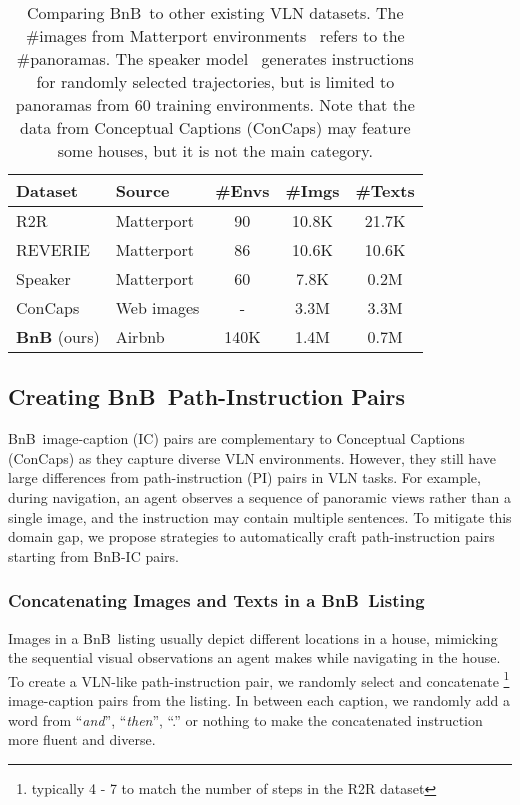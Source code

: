\RequirePackage[dvipsnames,table]{xcolor} \documentclass[10pt,twocolumn,letterpaper]{article}
\newcommand{\airbnb}{BnB}
\begin{document}
\begin{table}[t]
\centering
\tabcolsep=0.11cm
\small
\begin{tabular}{ll ccc}
\toprule
Dataset & Source & \#Envs & \#Imgs & \#Texts \\
\midrule
R2R~\cite{anderson2018r2r} & Matterport    & 90 & 10.8K & 21.7K \\
REVERIE~\cite{qi2020reverie} & Matterport  & 86 & 10.6K & 10.6K \\
Speaker~\cite{tan2019envdrop} & Matterport & 60 & 7.8K & 0.2M \\
\midrule
ConCaps~\cite{ConceptualCaptions} & Web images & - & 3.3M & 3.3M \\
\textbf{\airbnb} (ours) & Airbnb & 140K & 1.4M & 0.7M \\
\bottomrule
\end{tabular}
\vspace{-2mm}
\caption{Comparing \airbnb~to other existing VLN datasets.
The \#images from Matterport environments~\cite{Matterport3D} refers to the \#panoramas.
The speaker model~\cite{tan2019envdrop} generates instructions for randomly selected trajectories, but is limited to panoramas from 60 training environments.
Note that the data from Conceptual Captions (ConCaps) may feature some houses, but it is not the main category.
}
\vspace{-4mm}
\label{tab:bnb_dataset_cmpr}
\end{table}
 
\subsection{Creating \airbnb~Path-Instruction Pairs}
\label{sec:create_pi_pairs}
\airbnb~image-caption (IC) pairs are complementary to Conceptual Captions (ConCaps) as they capture diverse VLN environments.
However, they still have large differences from path-instruction (PI) pairs in VLN tasks.
For example, during navigation, an agent observes a sequence of panoramic views rather than a single image, and the instruction may contain multiple sentences.
To mitigate this domain gap, we propose strategies to automatically craft path-instruction pairs starting from \airbnb-IC pairs.

\subsubsection{Concatenating Images and Texts in a \airbnb~Listing}
\label{sec:concate_method}
Images in a \airbnb~listing usually depict different locations in a house, mimicking the sequential visual observations an agent makes while navigating in the house.
To create a VLN-like path-instruction pair,  we randomly select and concatenate \footnote{typically 4 - 7 to match the number of steps in the R2R dataset} image-caption pairs from the listing.
In between each caption, we randomly add a word from ``\emph{and}'', ``\emph{then}'', ``.'' or nothing to make the concatenated instruction more fluent and diverse.
\end{document}
